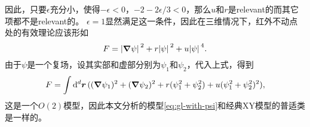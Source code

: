 \documentclass[hyperref, UTF8, a4paper]{ctexart}
\begin{document}
因此，只要$\epsilon$充分小，使得$-\epsilon<0$，$-2-2\epsilon/3<0$，那么$u$和$r$是relevant的而其它项都不是relevant的。
$\epsilon=1$显然满足这一条件，因此在三维情况下，红外不动点处的有效理论应该形如
\begin{equation}
    F = \abs*{\grad{\psi}}^2 + r \abs*{\psi}^2 + u \abs*{\psi}^4.
\end{equation}
由于$\psi$是一个复场，设其实部和虚部分别为$\psi_1$和$\psi_2$，代入上式，得到
\begin{equation}
    F = \int \dd[d]{\vb*{r}} ((\grad{\psi_1})^2 + (\grad{\psi_2})^2 + r (\psi_1^2 + \psi_2^2) + u (\psi_1^2 + \psi_2^2)^2),
\end{equation}
这是一个$O(2)$模型，因此本文分析的模型\eqref{eq:gl-with-psi}和经典XY模型的普适类是一样的。
\end{document}
